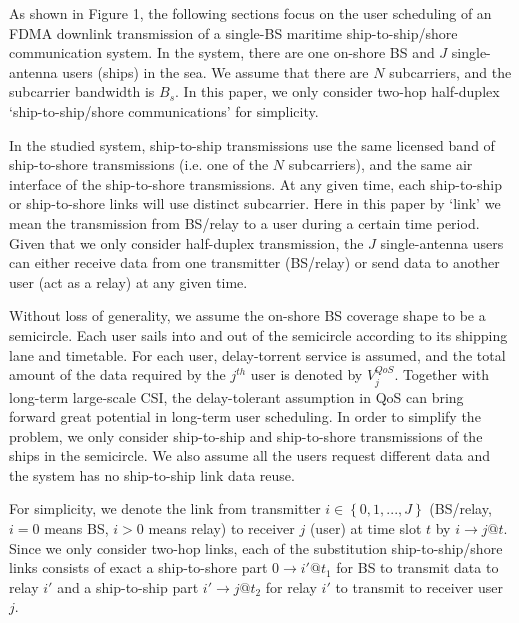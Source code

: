 \documentclass[conference]{IEEEtran}
\begin{document}
 As shown in Figure 1, the following sections focus on the user scheduling of an FDMA downlink transmission of a single-BS maritime ship-to-ship/shore communication system. In the system, there are one on-shore BS
 and $J$ single-antenna users (ships) in the sea. We assume that there are $N$ subcarriers, and the subcarrier bandwidth is ${B_s}$. In this paper, we only consider two-hop half-duplex `ship-to-ship/shore communications' for simplicity. 
 
 In the studied system, ship-to-ship transmissions use the same licensed band of ship-to-shore transmissions (i.e. one of the $N$ subcarriers), and the same air interface of the ship-to-shore transmissions. 
 At any given time, each ship-to-ship or ship-to-shore links will use distinct subcarrier. Here in this paper by `link' we mean the transmission from BS/relay to a user during a certain time period. 
 Given that we only consider half-duplex transmission, the $J$ single-antenna users can either receive data from one transmitter (BS/relay) or send data to another user (act as a relay) at any given time. 
 
 Without loss of generality, we assume the on-shore BS coverage shape to be a semicircle. 
 Each user sails into and out of the semicircle according to its shipping lane and timetable. 
 For each user, delay-torrent service is assumed, and the total amount of the data required by the ${j^{th}}$ user is denoted by $V_j^{QoS}$. Together with long-term large-scale CSI, the delay-tolerant assumption in QoS can bring forward great potential in long-term user scheduling. 
 In order to simplify the problem, we only consider ship-to-ship and ship-to-shore transmissions of the ships in the semicircle. We also assume all the users request different data and the system has no ship-to-ship link data reuse. 
 
 For simplicity, we denote the link from transmitter $i \in \left\{ {0,1,...,J} \right\}$ (BS/relay, $i = 0$ means BS, $i > 0$ means relay) to receiver $j$ (user) at time slot $t$ by $i \to j@t$. Since we only consider two-hop links, each of the substitution ship-to-ship/shore links consists of exact a ship-to-shore part $0 \to i'@{t_1}$ for BS to transmit data to relay ${i'}$ and a ship-to-ship part $i' \to j@{t_2}$ for relay ${i'}$ to transmit to receiver user $j$. 
 
\end{document}
